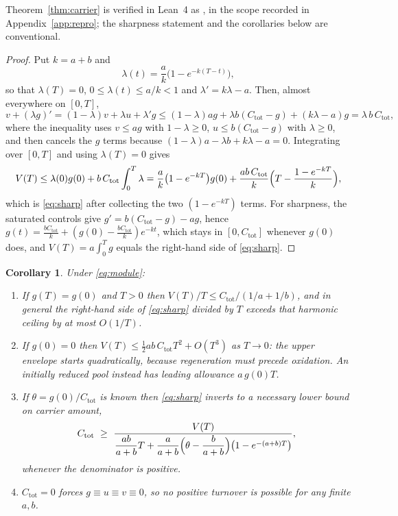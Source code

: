 \documentclass[11pt,a4paper]{article}
\theoremstyle{plain}
\newtheorem{corollary}[theorem]{Corollary}
\theoremstyle{definition}
\theoremstyle{remark}
\newcommand{\Ctot}{C_{\mathrm{tot}}}
\begin{document}
Theorem~\ref{thm:carrier} is verified in Lean~4 as
, in the scope recorded in
Appendix~\ref{app:repro}; the sharpness statement and the corollaries below are
conventional.

\begin{proof}
Put $k=a+b$ and
\[
\lambda(t)=\frac ak\bigl(1-e^{-k(T-t)}\bigr),
\]
so that $\lambda(T)=0$, $0\le\lambda(t)\le a/k<1$ and
$\lambda'=k\lambda-a$. Then, almost everywhere on $[0,T]$,
\[
v+(\lambda g)'=(1-\lambda)v+\lambda u+\lambda'g
\le(1-\lambda)ag+\lambda b(\Ctot-g)+(k\lambda-a)g
=\lambda\,b\,\Ctot ,
\]
where the inequality uses $v\le ag$ with $1-\lambda\ge 0$, $u\le b(\Ctot-g)$
with $\lambda\ge0$, and then cancels the $g$ terms because
$(1-\lambda)a-\lambda b+k\lambda-a=0$. Integrating over $[0,T]$ and using
$\lambda(T)=0$ gives
\[
V(T)\le\lambda(0)g(0)+b\,\Ctot\int_0^T\lambda
=\frac ak\bigl(1-e^{-kT}\bigr)g(0)
+\frac{ab\,\Ctot}{k}\Bigl(T-\frac{1-e^{-kT}}{k}\Bigr),
\]
which is \eqref{eq:sharp} after collecting the two $(1-e^{-kT})$ terms. For
sharpness, the saturated controls give
$g'=b(\Ctot-g)-ag$, hence
$g(t)=\tfrac{b\Ctot}{k}+(g(0)-\tfrac{b\Ctot}{k})e^{-kt}$, which stays in
$[0,\Ctot]$ whenever $g(0)$ does, and $V(T)=a\int_0^Tg$ equals the right-hand
side of \eqref{eq:sharp}.
\end{proof}

\begin{corollary}\label{cor:carrier}
Under \eqref{eq:module}:
\begin{enumerate}[label=(\alph*)]
\item If $g(T)=g(0)$ and $T>0$ then $V(T)/T\le \Ctot/(1/a+1/b)$, and in general
the right-hand side of \eqref{eq:sharp} divided by $T$ exceeds that harmonic
ceiling by at most $O(1/T)$.
\item If $g(0)=0$ then $V(T)\le\tfrac12ab\,\Ctot T^2+O(T^3)$ as $T\to0$: the
upper envelope starts quadratically, because regeneration must precede
oxidation. An initially reduced pool instead has leading allowance $a\,g(0)T$.
\item If $\theta=g(0)/\Ctot$ is known then \eqref{eq:sharp} inverts to a
necessary lower bound on carrier amount,
\begin{equation}\label{eq:required}
\Ctot\ \ge\
\frac{V(T)}{\dfrac{ab}{a+b}T
+\dfrac{a}{a+b}\Bigl(\theta-\dfrac{b}{a+b}\Bigr)\bigl(1-e^{-(a+b)T}\bigr)} ,
\end{equation}
whenever the denominator is positive.
\item $\Ctot=0$ forces $g\equiv u\equiv v\equiv0$, so no positive turnover is
possible for any finite $a,b$.
\end{enumerate}
\end{corollary}
\end{document}
